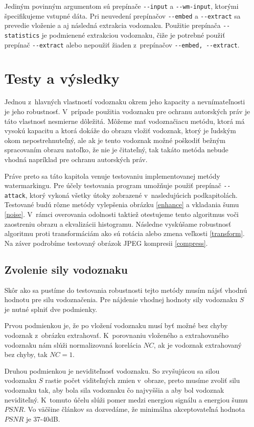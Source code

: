 Jediným povinným argumentom sú prepínače \verb|--input| a \verb|--wm-input|, ktorými špecifikujeme vstupné dáta. Pri neuvedení prepínačov \verb|--embed| a \verb|--extract| sa prevedie vloženie a aj následná extrakcia vodoznaku. Použitie prepínača \verb|--statistics| je podmienené extrakciou vodoznaku, čiže je potrebné použiť prepínač \verb|--extract| alebo nepoužiť žiaden z~prepínačov \verb|--embed, --extract|.


\chapter{Testy a výsledky} \label{testy}
Jednou z~hlavných vlastností vodoznaku okrem jeho kapacity a nevnímateľnosti je jeho robustnosť. V~prípade použitia vodoznaku pre ochranu autorských práv je táto vlastnosť nesmierne dôležitá. Môžeme mať vodoznačiacu metódu, ktorá má vysokú kapacitu a ktorá dokáže do obrazu vložiť vodoznak, ktorý je ľudským okom nepostrehnuteľný, ale ak je tento vodoznak možné poškodiť bežným spracovaním obrazu natoľko, že nie je čitateľný, tak takáto metóda nebude vhodná napríklad pre ochranu autorských práv.

Práve preto sa táto kapitola venuje testovaniu implementovanej metódy watermarkingu. Pre účely testovania program umožňuje použiť prepínač \verb|--attack|, ktorý vykoná všetky útoky zobrazené v~nasledujúcich podkapitolách.
Testované budú rôzne metódy vylepšenia obrázku \ref{enhance} a vkladania šumu \ref{noise}. V~rámci overovania odolnosti taktiež otestujeme tento algoritmus voči zaostreniu obrazu a ekvalizácii histogramu. Následne vyskúšame robustnosť algoritmu proti transformáciám ako sú rotácia alebo zmena veľkosti \ref{transform}. Na záver podrobíme testovaný obrázok JPEG kompresii \ref{compress}.

\section{Zvolenie sily vodoznaku}
Skôr ako sa pustíme do testovania robustnosti tejto metódy musím nájsť vhodnú hodnotu pre silu vodoznačenia. Pre nájdenie vhodnej hodnoty sily vodoznaku $S$ je nutné splniť dve podmienky.

Prvou podmienkou je, že po vložení vodoznaku musí byť možné bez chyby vodoznak z~obrázku extrahovať. K~porovnaniu vloženého a extrahovaného vodoznaku nám slúži normalizovaná korelácia $NC$, ak je vodoznak extrahovaný bez chyby, tak $NC = 1$.

Druhou podmienkou je neviditeľnosť vodoznaku. So zvyšujúcou sa silou vodoznaku $S$ rastie počet viditeľných zmien v~obraze, preto musíme zvoliť silu vodoznaku tak, aby bola sila vodoznaku čo najvyššia a aby bol vodoznak neviditeľný. K~tomuto účelu slúži pomer medzi energiou signálu a energiou šumu $PSNR$. Vo väčšine článkov sa dozvedáme, že minimálna akceptovateľná hodnota $PSNR$ je 37-40dB.


